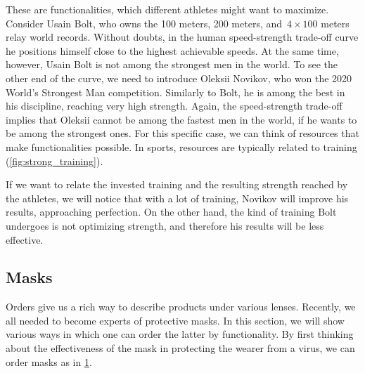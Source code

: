 These are functionalities, which different athletes might want to maximize.
Consider Usain Bolt, who owns the 100 meters, 200 meters, and~$4\times 100$ meters relay world records.
Without doubts, in the human speed-strength trade-off curve he positions himself close to the highest achievable speeds.
At the same time, however, Usain Bolt is not among the strongest men in the world.
To see the other end of the curve, we need to introduce Oleksii Novikov, who won the 2020 World's Strongest Man competition.
Similarly to Bolt, he is among the best in his discipline, reaching very high strength.
Again, the speed-strength trade-off implies that Oleksii cannot be among the fastest men in the world, if he wants to be among the strongest ones.
For this specific case, we can think of resources that make functionalities possible.
In sports, resources are typically related to training (\cref{fig:strong_training}).

\begin{marginfigure}
    \centering
    \caption{}
    \label{fig:strong_training}
\end{marginfigure}

If we want to relate the invested training and the resulting strength reached by the athletes, we will notice that with a lot of training, Novikov will improve his results, approaching perfection.
On the other hand, the kind of training Bolt undergoes is not optimizing strength, and therefore his results will be less effective.


\subsection{Masks}

Orders give us a rich way to describe products under various lenses.
Recently, we all needed to become experts of protective masks.
In this section, we will show various ways in which one can order the latter by functionality.
By first thinking about the effectiveness of the mask in protecting the wearer from a virus, we can order masks as in \cref{fig:masks_covid}.

\begin{figure}[h!]
    \centering
    \caption{}
    \label{fig:masks_covid}
\end{figure}

